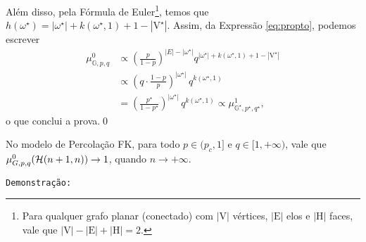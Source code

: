 Além disso, pela Fórmula de Euler\footnote{Para qualquer grafo planar (conectado) com $|\text{V}|$ vértices, $|\text{E}|$ elos e $|\text{H}|$ faces, vale que $|\text{V}| - |\text{E}| + |\text{H}| = 2$.}, temos que $h(\omega^{\star}) = |\omega^{\star}| + k(\omega^{\star}, 1) + 1 - |\text{V}^{\star}|$. Assim, da Expressão \eqref{eq:propto}, podemos escrever
\begin{align*}
\mu_{\mathbb{G}, p, q}^0 &\propto \left(\frac{p}{1 - p}\right)^{|E| - |\omega^{\star}|} q^{|\omega^{\star}| + k(\omega^{\star}, 1) + 1 - |\text{V}^{\star}|} \\
&\propto \left(q \cdot \frac{1 - p}{p}\right)^{|\omega^{\star}|} \, q^{k(\omega^{\star}, 1)} \\
&= \left(\frac{p^{\star}}{1 - p^{\star}}\right)^{|\omega^{\star}|} \, q^{k(\omega^{\star}, 1)} \propto \mu_{\mathbb{G}^{\star}, p^{\star}, q^{\star}}^{1},
\end{align*}
o que conclui a prova.\hspace{\fill}\qed

\begin{mypro} \label{prop-HLFK}
	No modelo de Percolação FK, para todo $p \in (p_c, 1]$ e $q \in 
	[1, +\infty)$, vale que $\mu_{G, p, q}^0(\operatorname{\mathcal{H}}(n + 1, n)) \rightarrow 1$, quando $n \rightarrow +\infty$.
\end{mypro}

\texttt{Demonstração:}

